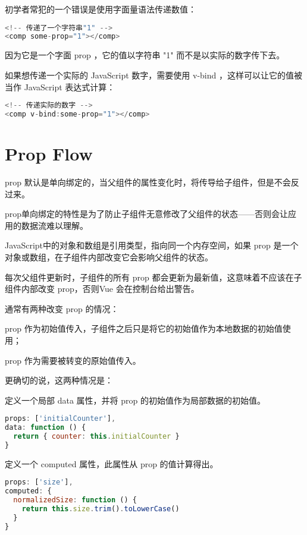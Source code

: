 初学者常犯的一个错误是使用字面量语法传递数值：

\begin{lstlisting}[language=JavaScript]
<!-- 传递了一个字符串"1" -->
<comp some-prop="1"></comp>
\end{lstlisting}


因为它是一个字面 prop ，它的值以字符串 "1" 而不是以实际的数字传下去。


如果想传递一个实际的 JavaScript 数字，需要使用 v-bind ，这样可以让它的值被当作 JavaScript 表达式计算：



\begin{lstlisting}[language=JavaScript]
<!-- 传递实际的数字 -->
<comp v-bind:some-prop="1"></comp>
\end{lstlisting}


\section{Prop Flow}




prop 默认是单向绑定的，当父组件的属性变化时，将传导给子组件，但是不会反过来。

prop单向绑定的特性是为了防止子组件无意修改了父组件的状态——否则会让应用的数据流难以理解。

JavaScript中的对象和数组是引用类型，指向同一个内存空间，如果 prop 是一个对象或数组，在子组件内部改变它会影响父组件的状态。

每次父组件更新时，子组件的所有 prop 都会更新为最新值，这意味着不应该在子组件内部改变 prop，否则Vue 会在控制台给出警告。



通常有两种改变 prop 的情况：

\begin{compactenum}
\item prop 作为初始值传入，子组件之后只是将它的初始值作为本地数据的初始值使用；
\item prop 作为需要被转变的原始值传入。
\end{compactenum}

更确切的说，这两种情况是：

\begin{compactenum}
\item 定义一个局部 data 属性，并将 prop 的初始值作为局部数据的初始值。

\begin{lstlisting}[language=JavaScript]
props: ['initialCounter'],
data: function () {
  return { counter: this.initialCounter }
}
\end{lstlisting}

\item 定义一个 computed 属性，此属性从 prop 的值计算得出。

\begin{lstlisting}[language=JavaScript]
props: ['size'],
computed: {
  normalizedSize: function () {
    return this.size.trim().toLowerCase()
  }
}
\end{lstlisting}


\end{compactenum}



